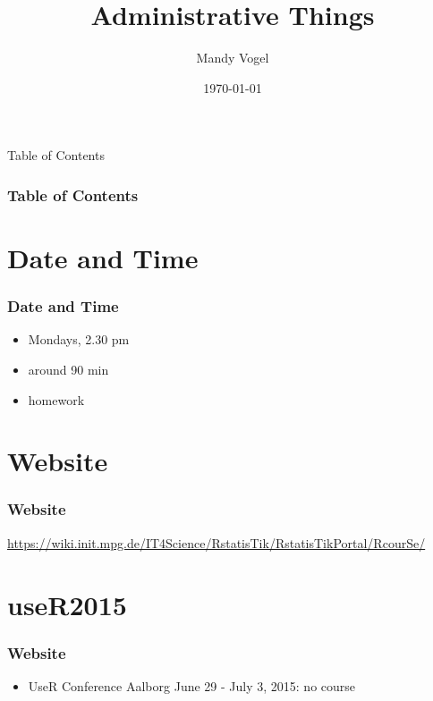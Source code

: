 \documentclass[xcolor={table},c]{beamer}
\begin{document}
\title{Administrative Things}   
\author{Mandy Vogel} 
\date{\today}

\begin{frame}[allowframebreaks,t]{Table of Contents}
\frametitle{Table of Contents}\tableofcontents
\end{frame}


\section{Date and Time}
\begin{frame}\frametitle{Date and Time}
  \begin{itemize}
  \item Mondays, 2.30 pm
  \item around 90 min
  \item homework
  \end{itemize}
\end{frame}

\section{Website}
\begin{frame}\frametitle{Website}
  \url{https://wiki.init.mpg.de/IT4Science/RstatisTik/RstatisTikPortal/RcourSe/}
\end{frame}


\section{useR2015}
\begin{frame}\frametitle{Website}
  \begin{itemize}
  \item UseR Conference Aalborg June 29 - July 3, 2015: no course  
  \end{itemize}
\end{frame}
\end{document}
